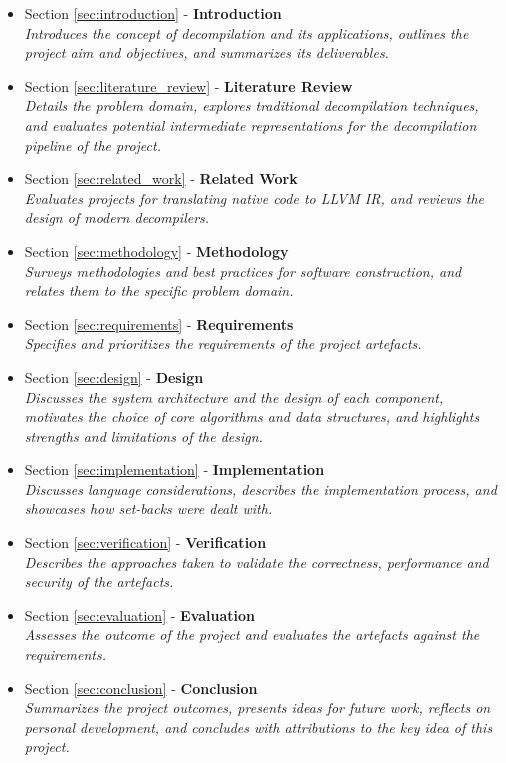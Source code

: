 \begin{itemize}
	\item Section \ref{sec:introduction} - \textbf{Introduction} \\ \textit{Introduces the concept of decompilation and its applications, outlines the project aim and objectives, and summarizes its deliverables.}
	\item Section \ref{sec:literature_review} - \textbf{Literature Review} \\ \textit{Details the problem domain, explores traditional decompilation techniques, and evaluates potential intermediate representations for the decompilation pipeline of the project.}
	\item Section \ref{sec:related_work} - \textbf{Related Work} \\ \textit{Evaluates projects for translating native code to LLVM IR, and reviews the design of modern decompilers.}
	\item Section \ref{sec:methodology} - \textbf{Methodology} \\ \textit{Surveys methodologies and best practices for software construction, and relates them to the specific problem domain.}
	\item Section \ref{sec:requirements} - \textbf{Requirements} \\ \textit{Specifies and prioritizes the requirements of the project artefacts.}
	\item Section \ref{sec:design} - \textbf{Design} \\ \textit{Discusses the system architecture and the design of each component, motivates the choice of core algorithms and data structures, and highlights strengths and limitations of the design.}
	\item Section \ref{sec:implementation} - \textbf{Implementation} \\ \textit{Discusses language considerations, describes the implementation process, and showcases how set-backs were dealt with.}
	\item Section \ref{sec:verification} - \textbf{Verification} \\ \textit{Describes the approaches taken to validate the correctness, performance and security of the artefacts.}
	\item Section \ref{sec:evaluation} - \textbf{Evaluation} \\ \textit{Assesses the outcome of the project and evaluates the artefacts against the requirements.}
	\item Section \ref{sec:conclusion} - \textbf{Conclusion} \\ \textit{Summarizes the project outcomes, presents ideas for future work, reflects on personal development, and concludes with attributions to the key idea of this project.}
\end{itemize}
